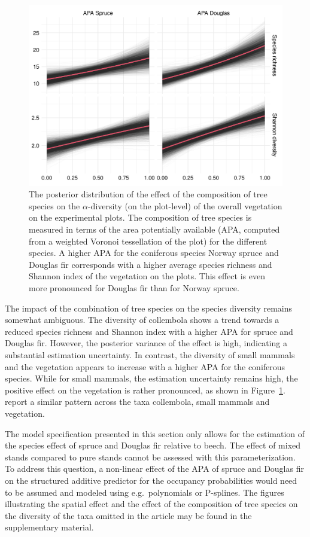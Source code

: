 \documentclass{article}
\begin{document}
\begin{figure}
\centering
\includegraphics[width=.7\linewidth]{figures/rtg-diversity-veg-apa}
\caption{The posterior distribution of the effect of the composition of tree species on the $\alpha$-diversity (on the plot-level) of the overall vegetation on the experimental plots. The composition of tree species is measured in terms of the area potentially available (APA, computed from a weighted Voronoi tessellation of the plot) for the different species. A higher APA for the coniferous species Norway spruce and Douglas fir corresponds with a higher average species richness and Shannon index of the vegetation on the plots. This effect is even more pronounced for Douglas fir than for Norway spruce.}
\label{fig:rtg-diversity-veg-apa}
\end{figure}

The impact of the combination of tree species on the species diversity remains somewhat ambiguous. The diversity of collembola shows a trend towards a reduced species richness and Shannon index with a higher APA for spruce and Douglas fir. However, the posterior variance of the effect is high, indicating a substantial estimation uncertainty. In contrast, the diversity of small mammals and the vegetation appears to increase with a higher APA for the coniferous species. While for small mammals, the estimation uncertainty remains high, the positive effect on the vegetation is rather pronounced, as shown in Figure~\ref{fig:rtg-diversity-veg-apa}. \citet{glatthornSpecies2023} report a similar pattern across the taxa collembola, small mammals and vegetation.

The model specification presented in this section only allows for the estimation of the species effect of spruce and Douglas fir relative to beech. The effect of mixed stands compared to pure stands cannot be assessed with this parameterization. To address this question, a non-linear effect of the APA of spruce and Douglas fir on the structured additive predictor for the occupancy probabilities would need to be assumed and modeled using e.g.~polynomials or P-splines. The figures illustrating the spatial effect and the effect of the composition of tree species on the diversity of the taxa omitted in the article may be found in the supplementary material.
\end{document}
